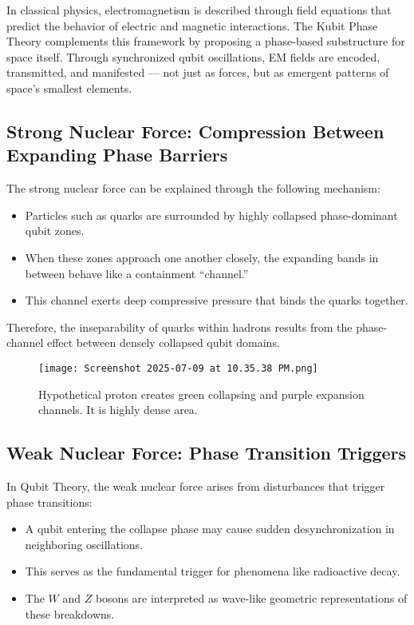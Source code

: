 \documentclass[12pt]{report} %
\begin{document}
In classical physics, electromagnetism is described through field equations that predict the behavior of electric and magnetic interactions. The Kubit Phase Theory complements this framework by proposing a phase-based substructure for space itself. Through synchronized qubit oscillations, EM fields are encoded, transmitted, and manifested — not just as forces, but as emergent patterns of space’s smallest elements.

\subsection{Strong Nuclear Force: Compression Between Expanding Phase Barriers}

The strong nuclear force can be explained through the following mechanism:

\begin{itemize}
  \item Particles such as quarks are surrounded by highly collapsed phase-dominant qubit zones.
  \item When these zones approach one another closely, the expanding bands in between behave like a containment “channel.”
  \item This channel exerts deep compressive pressure that binds the quarks together.
\end{itemize}



Therefore, the inseparability of quarks within hadrons results from the phase-channel effect between densely collapsed qubit domains.

\begin{figure}[H]
    \centering
    \texttt{[image: Screenshot 2025-07-09 at 10.35.38 PM.png]}
    \caption{Hypothetical proton creates green collapsing and purple expansion channels. It is highly dense area.  }
    \label{fig:enter-label}
\end{figure}

\subsection{Weak Nuclear Force: Phase Transition Triggers}

In Qubit Theory, the weak nuclear force arises from disturbances that trigger phase transitions:

\begin{itemize}
  \item A qubit entering the collapse phase may cause sudden desynchronization in neighboring oscillations.
  \item This serves as the fundamental trigger for phenomena like radioactive decay.
  \item The $W$ and $Z$ bosons are interpreted as wave-like geometric representations of these breakdowns.
\end{itemize}
\end{document}
